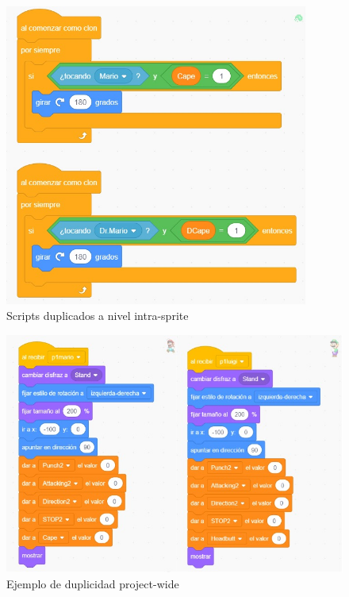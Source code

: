 \documentclass[a4paper, 12pt]{book}
\begin{document}
\begin{figure}[!htb]
	\centering
    \includegraphics[width=10cm, keepaspectratio]{img/duplicate_intrasprite.jpg}
    \caption{Scripts duplicados a nivel intra-sprite}
    \label{fig:duplicate_intrasprite}
\end{figure}

\begin{figure}[!htb]
	\centering
    \includegraphics[width=13cm, keepaspectratio]{img/duplicate_projectwide.jpg}
    \caption{Ejemplo de duplicidad project-wide}
    \label{fig:duplicate_projectwide}
\end{figure}
\end{document}
